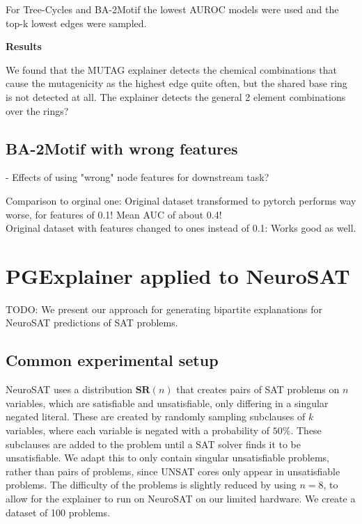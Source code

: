 For Tree-Cycles and BA-2Motif the lowest AUROC models were used and the top-k lowest edges were sampled.

\textbf{Results}

We found that the MUTAG explainer detects the chemical combinations that cause the mutagenicity as the highest edge quite often, but the shared base ring is not detected at all. The explainer detects the general 2 element combinations over the rings?





\subsection{BA-2Motif with wrong features}
- Effects of using "wrong" node features for downstream task?

Comparison to orginal one: Original dataset transformed to pytorch performs way worse, for features of 0.1! Mean AUC of about 0.4! \\
Original dataset with features changed to ones instead of 0.1: Works good as well.



\section{PGExplainer applied to NeuroSAT}
\label{sec:SAT-experiments}

TODO: We present our approach for generating bipartite explanations for NeuroSAT \cite{} predictions of SAT problems.

\subsection{Common experimental setup}

NeuroSAT \cite{selsam2018learning} uses a distribution $\textbf{SR}(n)$ that creates pairs of SAT problems on $n$ variables, which are satisfiable and unsatisfiable, only differing in a singular negated literal. These are created by randomly sampling subclauses of $k$ variables, where each variable is negated with a probability of $50\%$. These subclauses are added to the problem until a SAT solver \cite{een2003extensible} finds it to be unsatisfiable. We adapt this to only contain singular unsatisfiable problems, rather than pairs of problems, since UNSAT cores only appear in unsatisfiable problems. The difficulty of the problems is slightly reduced by using $n=8$, to allow for the explainer to run on NeuroSAT on our limited hardware. We create a dataset of 100 problems.

